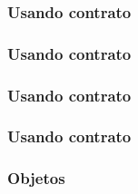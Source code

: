 \documentclass[14pt]{beamer}
\begin{document}
\frame
{
  \frametitle{Usando contrato}

  \usebox{\listingboxh}
}

\newsavebox{\listingboxi}
\begin{lrbox}{\listingboxi}

\end{lrbox}

\frame
{
  \frametitle{Usando contrato}

  \usebox{\listingboxi}
}

\newsavebox{\listingboxj}
\begin{lrbox}{\listingboxj}

\end{lrbox}

\frame
{
  \frametitle{Usando contrato}

  \usebox{\listingboxj}
}

\newsavebox{\listingboxk}
\begin{lrbox}{\listingboxk}

\end{lrbox}

\newsavebox{\listingboxl}
\begin{lrbox}{\listingboxl}

\end{lrbox}

\frame
{
  \frametitle{Usando contrato}

  \usebox{\listingboxk}
  \usebox{\listingboxl}
}

\frame
{
  \frametitle{Objetos}

  
}
\end{document}
